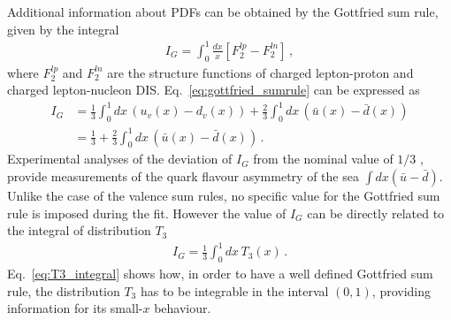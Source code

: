 %
Additional information about PDFs can be obtained by the Gottfried sum rule, given by the integral
\begin{align}
    \label{eq:gottfried_sumrule}
    I_G = \int_0^1 \frac{dx}{x} \left[F_2^{lp} - F_2^{ln}\right]\,,
\end{align}
where $F_2^{lp}$ and $F_2^{ln}$ are the structure functions of charged lepton-proton and charged lepton-nucleon DIS.
Eq.~\eqref{eq:gottfried_sumrule} can be expressed as
\begin{align}
    \label{eq:gottfried_sumrule_1}
    I_G &= \frac{1}{3}\int_0^1 dx\,\left(u_v\left(x\right) - d_v\left(x\right)\right) 
    + \frac{2}{3}\int_0^1 dx\,\left(\bar{u}\left(x\right) - \bar{d}\left(x\right)\right) \nonumber \\
    & = \frac{1}{3} + \frac{2}{3}\int_0^1 dx\,\left(\bar{u}\left(x\right) - \bar{d}\left(x\right)\right)\,. 
\end{align}
Experimental analyses of the deviation of $I_G$ from the nominal value of $1/3$ \cite{Amaudruz:1991at},
provide measurements of the quark flavour asymmetry of the sea $\int dx \left(\bar{u} - \bar{d}\right)$.
Unlike the case of the valence sum rules, no specific value for the Gottfried sum rule is imposed
during the fit.
However the value of $I_G$ can be directly related to the integral of distribution $T_3$ 
\begin{align}
    \label{eq:T3_integral}
    I_G = \frac{1}{3}\int_0^1 dx\, T_3\left(x\right)\,. 
\end{align}
Eq.~\eqref{eq:T3_integral} shows how, in order to have a well defined Gottfried sum rule, the distribution
$T_3$ has to be integrable in the interval $\left(0,1\right)$, providing information for its small-$x$ behaviour.



